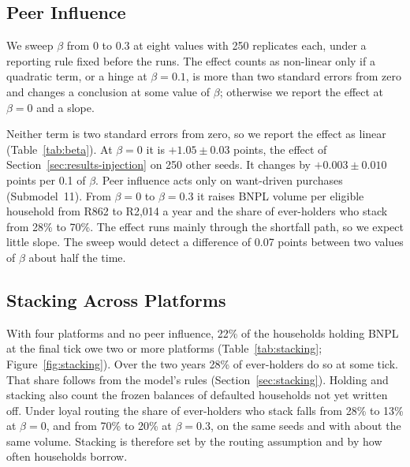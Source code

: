 \subsection{Peer Influence}
\label{sec:results-beta}

We sweep $\beta$ from 0 to 0.3 at eight values with 250 replicates each, under a reporting rule
fixed before the runs. The effect counts as non-linear only if a quadratic term, or a hinge at
$\beta=0.1$, is more than two standard errors from zero and changes a conclusion at some value of
$\beta$; otherwise we report the effect at $\beta=0$ and a slope.

Neither term is two standard errors from zero, so we report the effect as linear
(Table~\ref{tab:beta}). At $\beta=0$ it is $+1.05 \pm 0.03$ points, the effect of
Section~\ref{sec:results-injection} on 250 other seeds. It changes by $+0.003 \pm 0.010$ points per 0.1 of $\beta$.
Peer influence acts only on want-driven purchases (Submodel~11). From $\beta=0$ to $\beta=0.3$ it
raises \ac{BNPL} volume per eligible household from R862 to R2{,}014 a year and the share of
ever-holders who stack from 28\% to 70\%. The effect runs mainly through the shortfall path, so
we expect little slope. The sweep would detect a
difference of 0.07 points between two values of $\beta$ about half the time.



\subsection{Stacking Across Platforms}
\label{sec:results-stacking}

With four platforms and no peer influence, 22\% of the households holding \ac{BNPL} at the
final tick owe two or more platforms (Table~\ref{tab:stacking}; Figure~\ref{fig:stacking}).
Over the two years 28\% of ever-holders do so at some tick. That share follows from the model's
rules (Section~\ref{sec:stacking}). Holding and stacking also count the frozen balances of
defaulted households not yet written off. Under loyal routing the share of ever-holders who
stack falls from 28\% to 13\% at $\beta=0$, and from 70\% to 20\% at $\beta=0.3$, on the same
seeds and with about the same volume. Stacking is therefore set by the routing assumption and by
how often households borrow.

